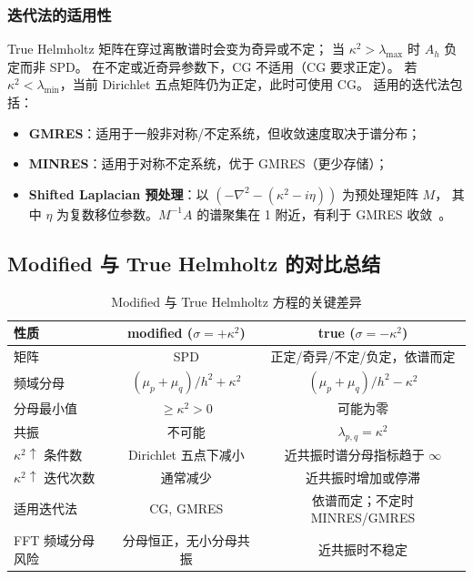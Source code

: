 \subsubsection{迭代法的适用性}

True Helmholtz 矩阵在穿过离散谱时会变为奇异或不定；
当 $\kappa^2>\lambda_{\max}$ 时 $A_h$ 负定而非 SPD。
在不定或近奇异参数下，CG 不适用（CG 要求正定）。
若 $\kappa^2<\lambda_{\min}$，当前 Dirichlet 五点矩阵仍为正定，此时可使用 CG。
适用的迭代法包括：
\begin{itemize}[itemsep=2pt]
  \item \textbf{GMRES}：适用于一般非对称/不定系统，但收敛速度取决于谱分布；
  \item \textbf{MINRES}：适用于对称不定系统，优于 GMRES（更少存储）；
  \item \textbf{Shifted Laplacian 预处理}：以 $(-\nabla^2-(\kappa^2-i\eta))$ 为预处理矩阵 $M$，
        其中 $\eta$ 为复数移位参数。$M^{-1}A$ 的谱聚集在 1 附近，有利于 GMRES 收敛~\cite{Ernst2011}。
\end{itemize}

\subsection{Modified 与 True Helmholtz 的对比总结}

\begin{table}[H]
\centering
\caption{Modified 与 True Helmholtz 方程的关键差异}
\label{tab:modified_vs_true}
\small
\begin{tabular}{lcc}
\toprule
性质 & modified ($\sigma=+\kappa^2$) & true ($\sigma=-\kappa^2$) \\
\midrule
矩阵 & SPD & 正定/奇异/不定/负定，依谱而定 \\
频域分母 & $(\mu_p+\mu_q)/h^2+\kappa^2$ & $(\mu_p+\mu_q)/h^2-\kappa^2$ \\
分母最小值 & $\geq \kappa^2 > 0$ & 可能为零 \\
共振 & 不可能 & $\lambda_{p,q}=\kappa^2$ \\
$\kappa^2\!\uparrow$ 条件数 & Dirichlet 五点下减小 & 近共振时谱分母指标趋于 $\infty$ \\
$\kappa^2\!\uparrow$ 迭代次数 & 通常减少 & 近共振时增加或停滞 \\
适用迭代法 & CG, GMRES & 依谱而定；不定时 MINRES/GMRES \\
FFT 频域分母风险 & 分母恒正，无小分母共振 & 近共振时不稳定 \\
\bottomrule
\end{tabular}
\end{table}


